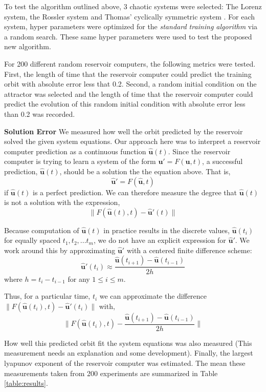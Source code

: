 \documentclass[journal]{journal}
\begin{document}
To test the algorithm outlined above, 3 chaotic systems were selected: The Lorenz system, the Rossler system and Thomas' cyclically symmetric system \cite{Thomas, Lorenz, Rossler}. For each system, hyper parameters were optimized for the \textit{standard training algorithm} via a random search. These same hyper parameters were used to test the proposed new algorithm. 

For 200 different random reservoir computers, the following metrics were tested. First, the length of time that the reservoir computer could predict the training orbit with absolute error less that 0.2. Second, a random initial condition on the attractor was selected and the length of time that the reservoir computer could predict the evolution of this random initial condition with absolute error less than 0.2 was recorded. 

\textbf{Solution Error} We measured how well the orbit predicted by the reservoir solved the given system equations. Our approach here was to interpret a reservoir computer prediction as a continuous function $\hat{\mathbf{u}}(t)$. Since the reservoir computer is trying to learn a system of the form $\mathbf{u}'= F(\mathbf{u}, t)$, a successful prediction, $\hat{\mathbf{u}}(t)$, should be a solution the the equation above. That is,
\[
\hat{\mathbf{u}}' = F(\hat{\mathbf{u}}, t)
\]
if $\hat{\mathbf{u}}(t)$ is a perfect prediction. We can therefore measure the degree that $\hat{\mathbf{u}}(t)$ is not a solution with the expression,
\[
\| F(\hat{\mathbf{u}}(t), t) - \hat{\mathbf{u}}'(t) \|
\]

Because computation of $\hat{\mathbf{u}}(t)$ in practice results in the discrete values, $\hat{\mathbf{u}}(t_i)$ for equally spaced $t_1, t_2, ... t_m$, we do not have an explicit expression for $\hat{\mathbf{u}}'$.  We work around this by approximating $\hat{\mathbf{u}}'$ with a centered finite difference scheme:
\[
\hat{\mathbf{u}}'(t_i) \approx \frac{\hat{\mathbf{u}}(t_{i+1}) - \hat{\mathbf{u}}(t_{i-1})}{2h}
\]
where $h = t_i - t_{i - 1}$ for any $1 \leq i \leq m$.

Thus, for a particular time, $t_i$ we can approximate the difference $\| F(\hat{\mathbf{u}}(t_i), t) - \hat{\mathbf{u}}'(t_i) \|$ with,
\[
\|F(\hat{\mathbf{u}}(t_i), t) - \frac{\hat{\mathbf{u}}(t_{i+1}) - \hat{\mathbf{u}}(t_{i-1})}{2h} \|
\]

How well this predicted orbit fit the system equations was also measured (This measurement needs an explanation and some development). Finally, the largest lyapunov exponent of the reservoir computer was estimated. The mean these measurements taken from 200 experiments are summarized in Table \ref{table:results}.
\end{document}

